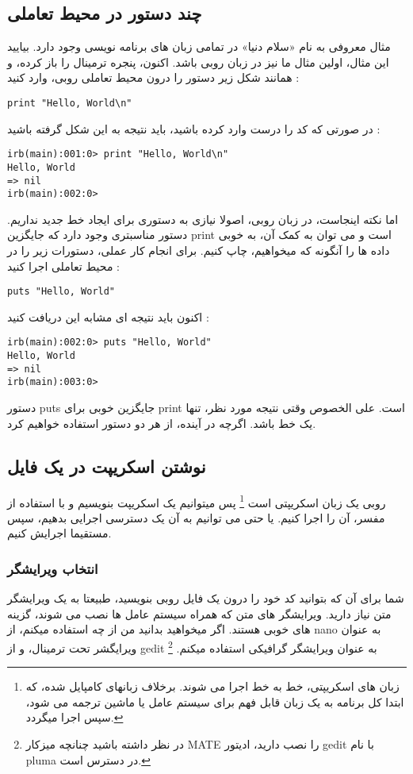 \documentclass[11pt]{article}
\begin{document}
\subsection{چند دستور در محیط تعاملی}
مثال معروفی به نام «سلام دنیا» در تمامی زبان های برنامه نویسی وجود دارد. بیایید این مثال، اولین مثال ما نیز در زبان روبی باشد. 
اکنون، پنجره ترمینال را باز کرده، و همانند شکل زیر دستور را درون محیط تعاملی روبی، وارد کنید :
\begin{latin}
\begin{verbatim}
print "Hello, World\n"
\end{verbatim}
\end{latin}
در صورتی که کد را درست وارد کرده باشید، باید نتیجه به این شکل گرفته باشید :
\begin{latin}
\begin{verbatim}
irb(main):001:0> print "Hello, World\n"
Hello, World
=> nil
irb(main):002:0> 
\end{verbatim}
\end{latin}
اما نکته اینجاست، در زبان روبی، اصولا نیازی به دستوری برای ایجاد خط جدید نداریم. دستور مناسبتری وجود دارد که جایگزین print است و می توان به کمک آن، به خوبی داده ها را آنگونه که میخواهیم، چاپ کنیم. برای انجام کار عملی، دستورات زیر را در محیط تعاملی اجرا کنید :
\begin{latin}
\begin{verbatim}
puts "Hello, World"
\end{verbatim}
\end{latin}
اکنون باید نتیجه ای مشابه این دریافت کنید :
\begin{latin}
\begin{verbatim}
irb(main):002:0> puts "Hello, World"
Hello, World
=> nil
irb(main):003:0> 
\end{verbatim}
\end{latin}
دستور puts جایگزین خوبی برای print است. علی الخصوص وقتی نتیجه مورد نظر، تنها یک خط باشد. اگرچه در آینده، از هر دو دستور استفاده خواهیم کرد. 
\subsection{نوشتن اسکریپت در یک فایل}
روبی یک زبان اسکریپتی است
\footnote{زبان های اسکریپتی، خط به خط اجرا می شوند. برخلاف زبانهای کامپایل شده، که ابتدا کل برنامه به یک زبان قابل فهم برای سیستم عامل یا ماشین ترجمه می شود، سپس اجرا میگردد. }
پس میتوانیم یک اسکریپت بنویسیم و با استفاده از مفسر، آن را اجرا کنیم. یا حتی می توانیم به آن یک دسترسی اجرایی بدهیم، سپس مستقیما اجرایش کنیم. 
\subsubsection{انتخاب ویرایشگر}
شما برای آن که بتوانید کد خود را درون یک فایل روبی بنویسید، طبیعتا به یک ویرایشگر متن
نیاز دارید. ویرایشگر های متن که همراه سیستم عامل ها نصب می شوند، گزینه های خوبی هستند. اگر میخواهید بدانید من از چه استفاده میکنم، از nano به عنوان ویرایگشر تحت ترمینال، و از gedit به عنوان ویرایشگر گرافیکی استفاده میکنم.
\footnote{در نظر داشته باشید چنانچه میزکار MATE را نصب دارید، ادیتور gedit با نام pluma در دسترس است. }
\end{document}
